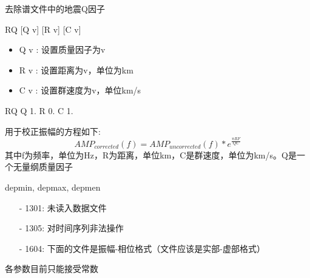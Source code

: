 \label{cmd:rq}

去除谱文件中的地震Q因子

\begin{SACSTX}
RQ [Q v] [R v] [C v]
\end{SACSTX}

\begin{itemize}
\item Q v : 设置质量因子为v 
\item R v : 设置距离为v，单位为km 
\item C v : 设置群速度为v，单位km/s 
\end{itemize}

\begin{SACDFT}
RQ Q 1. R 0. C 1.
\end{SACDFT}

用于校正振幅的方程如下:
\[ AMP_{corrected}(f) = AMP_{uncorrected}(f) * e^{\frac{\pi R F}{Q C}} \]
其中f为频率，单位为Hz，R为距离，单位km，C是群速度，单位为km/s。Q是一个无量纲质量因子

depmin, depmax, depmen

\begin{itemize}
\item[-]1301: 未读入数据文件
\item[-]1305: 对时间序列非法操作
\end{itemize}

\begin{itemize}
\item[-]1604: 下面的文件是振幅-相位格式（文件应该是实部-虚部格式）
\end{itemize}

各参数目前只能接受常数
